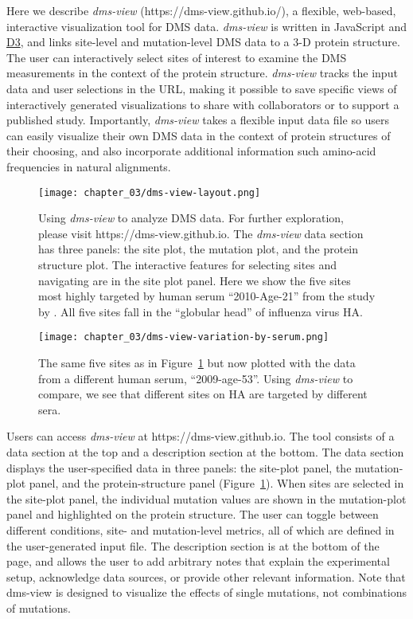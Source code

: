 Here we describe \emph{dms-view} (https://dms-view.github.io/), a flexible, web-based, interactive visualization tool for DMS data.
\emph{dms-view} is written in JavaScript and \href{https://d3js.org}{D3}, and links site-level and mutation-level DMS data to a 3-D protein structure.
The user can interactively select sites of interest to examine the DMS measurements in the context of the protein structure.
\emph{dms-view} tracks the input data and user selections in the URL, making it possible to save specific views of interactively generated visualizations to share with collaborators or to support a published study.
Importantly, \emph{dms-view} takes a flexible input data file so users can easily visualize their own DMS data in the context of protein structures of their choosing, and also incorporate additional information such amino-acid frequencies in natural alignments.

\begin{figure}
  \centering
  \texttt{[image: chapter\_03/dms-view-layout.png]}
  \caption{\label{fig:dms-view-layout}Using \emph{dms-view} to analyze DMS data.
    For further exploration, please visit https://dms-view.github.io.
    The \emph{dms-view} data section has three panels: the site plot, the mutation plot, and the protein structure plot.
    The interactive features for selecting sites and navigating are in the site plot panel.
    Here we show the five sites most highly targeted by human serum ``2010-Age-21'' from the study by \citet{Lee2019}.
    All five sites fall in the ``globular head'' of influenza virus HA.}
\end{figure}

\begin{figure}
  \centering
  \texttt{[image: chapter\_03/dms-view-variation-by-serum.png]}
  \caption{\label{fig:dms-view-variation-by-serum} The same five sites as in Figure~\ref{fig:dms-view-layout} but now plotted with the data from a different human serum, ``2009-age-53''.
    Using \emph{dms-view} to compare, we see that different sites on HA are targeted by different sera.}
\end{figure}

Users can access \emph{dms-view} at https://dms-view.github.io.
The tool consists of a data section at the top and a description section at the bottom.
The data section displays the user-specified data in three panels: the site-plot panel, the mutation-plot panel, and the protein-structure panel (Figure~\ref{fig:dms-view-layout}).
When sites are selected in the site-plot panel, the individual mutation values are shown in the mutation-plot panel and highlighted on the protein structure.
The user can toggle between different conditions, site- and mutation-level metrics, all of which are defined in the user-generated input file.
The description section is at the bottom of the page, and allows the user to add arbitrary notes that explain the experimental setup, acknowledge data sources, or provide other relevant information.
Note that dms-view is designed to visualize the effects of single mutations, not combinations of mutations.

